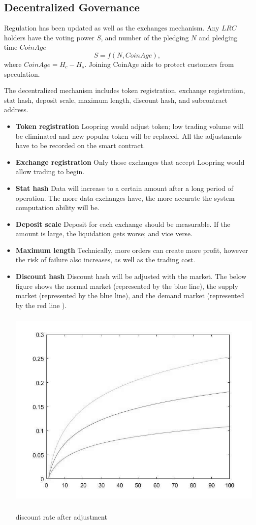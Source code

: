 \documentclass[UTF8,nofonts]{article}
\makeatletter
\newenvironment{figurehere}
 {\def\@captype{figure}}
 {}
\makeatother
\begin{document}
\subsection{Decentralized Governance}
Regulation has been updated as well as the exchanges mechanism. Any $LRC$ holders have the voting power $S$, and number of the pledging $N$ and pledging time $CoinAge$
$$S = f(N,  CoinAge)\text{, }$$
where $CoinAge = H_{c}-H_{s}$. Joining CoinAge aids to protect customers from speculation.

The decentralized mechanism includes token registration, exchange registration, stat hash, deposit scale, maximum length, discount hash, and subcontract address.
 \begin{itemize}
   \item \textbf{Token registration} Loopring would adjust token; low trading volume will be eliminated and new popular token will be replaced. All the adjustments have to be recorded on the smart contract.
  \item \textbf{Exchange registration} Only those exchanges that accept Loopring would allow trading to begin.
   \item \textbf{Stat hash} Data will increase to a certain amount after a long period of operation. The more data exchanges have, the more accurate the system computation ability will be.
  \item \textbf{Deposit scale} Deposit for each exchange should be measurable. If the amount is large, the liquidation gets worse; and vice verse.
   \item \textbf{Maximum length} Technically, more orders can create more profit, however the risk of failure also increases, as well as the trading cost.
   \item \textbf{Discount hash} Discount hash will be adjusted with the market. The below figure shows the normal market (represented by the blue line), the supply market (represented by the blue line), and the demand market (represented by the red line ).
\begin{center}
\begin{figurehere}
\includegraphics[height=10cm]{images/rate_adjust.jpg}
\caption{discount rate after adjustment}
\label{fig: dischargeRateAdjust}
\end{figurehere}
\end{center}


\end{itemize}
\end{document}
